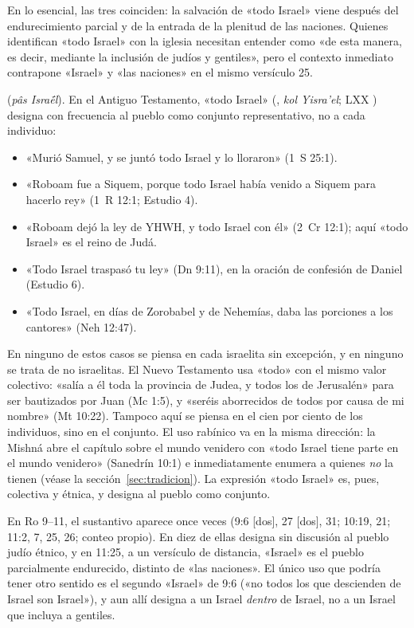 En lo esencial, las tres coinciden: la salvación de «todo Israel» viene después del endurecimiento parcial y de la entrada de la plenitud de las naciones. Quienes identifican «todo Israel» con la iglesia necesitan entender  como «de esta manera, es decir, mediante la inclusión de judíos y gentiles», pero el contexto inmediato contrapone «Israel» y «las naciones» en el mismo versículo 25.

\textbf{} (\emph{pâs Israḗl}). En el Antiguo Testamento, «todo Israel» (, \emph{kol Yisra'el}; LXX ) designa con frecuencia al pueblo como conjunto representativo, no a cada individuo:
\begin{itemize}
\item «Murió Samuel, y se juntó todo Israel y lo lloraron» (1~S 25:1).
\item «Roboam fue a Siquem, porque todo Israel había venido a Siquem para hacerlo rey» (1~R 12:1; Estudio 4).
\item «Roboam dejó la ley de YHWH, y todo Israel con él» (2~Cr 12:1); aquí «todo Israel» es el reino de Judá.
\item «Todo Israel traspasó tu ley» (Dn 9:11), en la oración de confesión de Daniel (Estudio 6).
\item «Todo Israel, en días de Zorobabel y de Nehemías, daba las porciones a los cantores» (Neh 12:47).
\end{itemize}
En ninguno de estos casos se piensa en cada israelita sin excepción, y en ninguno se trata de no israelitas. El Nuevo Testamento usa «todo» con el mismo valor colectivo: «salía a él toda la provincia de Judea, y todos los de Jerusalén» para ser bautizados por Juan (Mc 1:5), y «seréis aborrecidos de todos por causa de mi nombre» (Mt 10:22). Tampoco aquí se piensa en el cien por ciento de los individuos, sino en el conjunto. El uso rabínico va en la misma dirección: la Mishná abre el capítulo sobre el mundo venidero con «todo Israel tiene parte en el mundo venidero» (Sanedrín 10:1) e inmediatamente enumera a quienes \emph{no} la tienen (véase la sección~\ref{sec:tradicion}). La expresión «todo Israel» es, pues, colectiva y étnica, y designa al pueblo como conjunto.

En Ro 9--11, el sustantivo  aparece once veces (9:6 [dos], 27 [dos], 31; 10:19, 21; 11:2, 7, 25, 26; conteo propio). En diez de ellas designa sin discusión al pueblo judío étnico, y en 11:25, a un versículo de distancia, «Israel» es el pueblo parcialmente endurecido, distinto de «las naciones». El único uso que podría tener otro sentido es el segundo «Israel» de 9:6 («no todos los que descienden de Israel son Israel»), y aun allí designa a un Israel \emph{dentro} de Israel, no a un Israel que incluya a gentiles.

